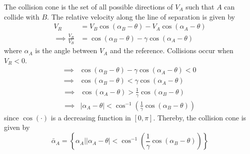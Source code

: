 The collision cone is the set of all possible directions of \( V_A \) such that \( A \) can collide with \( B \).
The relative velocity along the line of separation is given by
\begin{align*}
      V_{R}
       & =
      V_B \cos (\alpha_B - \theta) - V_A \cos (\alpha_A - \theta)
      \\
      \implies
      \frac{V_R}{V_B}
       & =
      \cos (\alpha_B - \theta) - \gamma \cos (\alpha_A - \theta)
\end{align*}
where \( \alpha_A \) is the angle between \( V_A \) and the reference.
Collisions occur when \( V_R < 0 \).
\begin{align*}
      \implies &
      \cos (\alpha_B - \theta) - \gamma \cos (\alpha_A - \theta) < 0
      \\ \implies &
      \cos (\alpha_B - \theta) < \gamma \cos (\alpha_A - \theta)
\end{align*}
\begin{align*}
      \implies &
      \cos (\alpha_A - \theta) > \frac{1}{\gamma} \cos (\alpha_B - \theta)
      \\ \implies &
      \vert \alpha_A - \theta \vert < \cos^{-1} \left( \frac{1}{\gamma} \cos (\alpha_B - \theta) \right)
\end{align*}
since \( \cos(\cdot) \) is a decreasing function in \( [0, \pi] \). Thereby, the collision cone is given by
\begin{equation*}
      \boxed{
            \bar \alpha_A = \left \{ \alpha_A \Big| \vert \alpha_A - \theta \vert < \cos^{-1} \left( \frac{1}{\gamma} \cos (\alpha_B - \theta) \right) \right \}
      }
\end{equation*}

